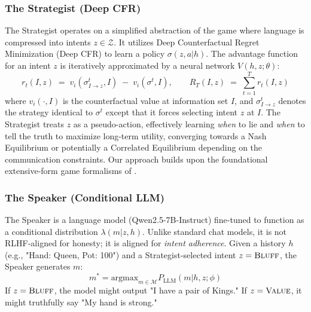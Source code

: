 \documentclass{article}
\begin{document}
\subsubsection{The Strategist (Deep CFR)}
The Strategist operates on a simplified abstraction of the game where language is compressed into intents $z \in \mathcal{Z}$. It utilizes Deep Counterfactual Regret Minimization (Deep CFR) \citep{brown2019deep} to learn a policy $\sigma(z, a | h)$.
The advantage function for an intent $z$ is iteratively approximated by a neural network $V(h, z; \theta)$:
\begin{equation}
    r_t(I, z) \;=\; v_i(\sigma^t_{I \rightarrow z}, I) \;-\; v_i(\sigma^t, I), 
    \qquad
    R_T(I, z) \;=\; \sum_{t=1}^T r_t(I, z)
\end{equation}
where $v_i(\cdot, I)$ is the counterfactual value at information set $I$, and $\sigma^t_{I\to z}$ denotes the strategy identical to $\sigma^t$ except that it forces selecting intent $z$ at $I$. The Strategist treats $z$ as a pseudo-action, effectively learning \textit{when} to lie and \textit{when} to tell the truth to maximize long-term utility, converging towards a Nash Equilibrium \citep{nash1950equilibrium} or potentially a Correlated Equilibrium \citep{aumann1974subjectivity} depending on the communication constraints. Our approach builds upon the foundational extensive-form game formalisms of \citet{kuhn1953extensive}.

\subsubsection{The Speaker (Conditional LLM)}
The Speaker is a language model (Qwen2.5-7B-Instruct) fine-tuned to function as a conditional distribution $\lambda(m | z, h)$. Unlike standard chat models, it is not RLHF-aligned for honesty; it is aligned for \textit{intent adherence}.
Given a history $h$ (e.g., "Hand: Queen, Pot: 100") and a Strategist-selected intent $z = \textsc{Bluff}$, the Speaker generates $m$:
\begin{equation}
    m^* = \text{argmax}_{m \in \mathcal{M}} P_{\text{LLM}}(m | h, z; \phi)
\end{equation}
If $z=\textsc{Bluff}$, the model might output "I have a pair of Kings." If $z=\textsc{Value}$, it might truthfully say "My hand is strong."
\end{document}

